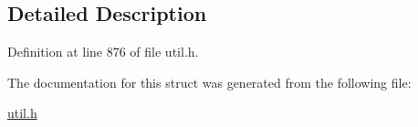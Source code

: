 \subsection{Detailed Description}


Definition at line 876 of file util.\+h.



The documentation for this struct was generated from the following file\+:\begin{DoxyCompactItemize}
\item 
\hyperlink{util_8h}{util.\+h}\end{DoxyCompactItemize}
